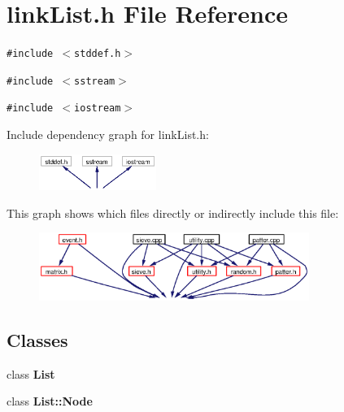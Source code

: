\section{link\-List.h File Reference}
\label{linkList_8h}
{\tt \#include $<$stddef.h$>$}\par
{\tt \#include $<$sstream$>$}\par
{\tt \#include $<$iostream$>$}\par


Include dependency graph for link\-List.h:\begin{figure}[H]
\begin{center}
\leavevmode
\includegraphics[width=108pt]{linkList_8h__incl}
\end{center}
\end{figure}


This graph shows which files directly or indirectly include this file:\begin{figure}[H]
\begin{center}
\leavevmode
\includegraphics[width=249pt]{linkList_8h__dep__incl}
\end{center}
\end{figure}
\subsection*{Classes}
\begin{CompactItemize}
\item 
class {\bf List}
\item 
class {\bf List::Node}
\end{CompactItemize}

